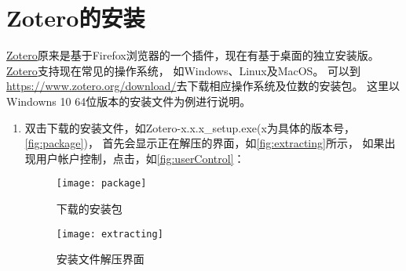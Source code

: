\documentclass[cn,11pt,chinese]{elegantbook}
\begin{document}
	\section{Zotero的安装} 
		\href{https://www.zotero.org/}{Zotero}原来是基于Firefox浏览器的一个插件，现在有基于桌面的独立安装版。\href{https://www.zotero.org/}{Zotero}支持现在常见的操作系统，
		如Windows、Linux及MacOS。
		可以到\url{https://www.zotero.org/download/}去下载相应操作系统及位数的安装包。
		这里以Windowns 10 64位版本的安装文件为例进行说明。
		\begin{enumerate}
			\item 双击下载的安装文件，如Zotero-x.x.x\_setup.exe(x为具体的版本号，\autoref{fig:package})，
			首先会显示正在解压的界面，如\autoref{fig:extracting}所示，
			如果出现用户帐户控制，点击，如\autoref{fig:userControl}：
			\begin{figure}[htbp]
				\centering
				\begin{minipage}[t]{\dimexpr0.5\textwidth-4em}
					\centering
					\texttt{[image: package]}
					\caption{下载的安装包}
					\label{fig:package}
				\end{minipage}
				\begin{minipage}[t]{\dimexpr0.5\textwidth-4em}
					\centering
					\texttt{[image: extracting]}
					\caption{安装文件解压界面}
					\label{fig:extracting}
				\end{minipage}
			\end{figure}
			

\end{enumerate}
\end{document}
